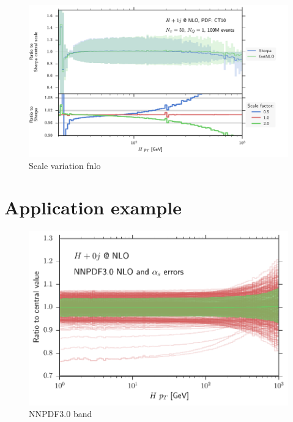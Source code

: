 %
\begin{figure}
	\centering
	\includegraphics[width=\textwidth]{images/scalesvar_hjnlo_fnlo.pdf}
	\caption{Scale variation fnlo}
\end{figure}
%

\section{Application example}
%
\begin{figure}
	\centering
	\includegraphics[width=\textwidth]{images/nnpdf_band.pdf}
	\caption{NNPDF3.0 band}
\end{figure}
%
